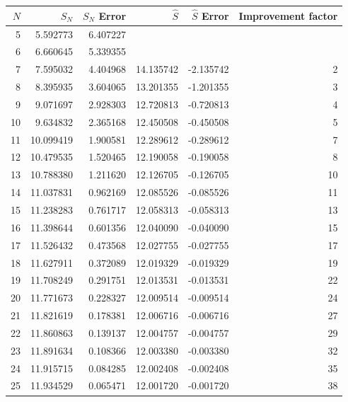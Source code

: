 \documentclass[answers]{exam}
\newcommand{\wh}{\widehat}
\begin{document}
\begin{questions}
\begin{parts}
\begin{solution}
\begin{tabular}{rrrrrr}
    \toprule
    $N$ & $S_N$ & $S_N$ Error & $\wh S$ & $\wh S$ Error & Improvement factor \\
    \midrule
    5 & 5.592773 & 6.407227 &  &  &  \\
    6 & 6.660645 & 5.339355 &  &  &  \\
    7 & 7.595032 & 4.404968 & 14.135742 & -2.135742 & 2 \\
    8 & 8.395935 & 3.604065 & 13.201355 & -1.201355 & 3 \\
    9 & 9.071697 & 2.928303 & 12.720813 & -0.720813 & 4 \\
    10 & 9.634832 & 2.365168 & 12.450508 & -0.450508 & 5 \\
    11 & 10.099419 & 1.900581 & 12.289612 & -0.289612 & 7 \\
    12 & 10.479535 & 1.520465 & 12.190058 & -0.190058 & 8 \\
    13 & 10.788380 & 1.211620 & 12.126705 & -0.126705 & 10 \\
    14 & 11.037831 & 0.962169 & 12.085526 & -0.085526 & 11 \\
     15 & 11.238283 & 0.761717 & 12.058313 & -0.058313 & 13 \\
     16 & 11.398644 & 0.601356 & 12.040090 & -0.040090 & 15 \\
     17 & 11.526432 & 0.473568 & 12.027755 & -0.027755 & 17 \\
     18 & 11.627911 & 0.372089 & 12.019329 & -0.019329 & 19 \\
     19 & 11.708249 & 0.291751 & 12.013531 & -0.013531 & 22 \\
     20 & 11.771673 & 0.228327 & 12.009514 & -0.009514 & 24 \\
     21 & 11.821619 & 0.178381 & 12.006716 & -0.006716 & 27 \\
     22 & 11.860863 & 0.139137 & 12.004757 & -0.004757 & 29 \\
     23 & 11.891634 & 0.108366 & 12.003380 & -0.003380 & 32 \\
     24 & 11.915715 & 0.084285 & 12.002408 & -0.002408 & 35 \\
     25 & 11.934529 & 0.065471 & 12.001720 & -0.001720 & 38 \\
    \bottomrule
\end{tabular}

\end{solution}



\end{parts}




\end{questions}
\end{document}
